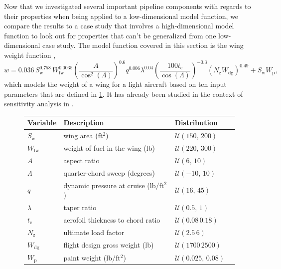 \documentclass[
  a4paper,  %
  twoside,  %
  bibliography=totoc,
  headsepline,
  cleardoublepage=empty,
  parskip=half,
  draft=false
]{scrbook}
\begin{document}
Now that we investigated several important pipeline components with regards to their properties when being applied to a low-dimensional model function, we compare the results to a case study that involves a high-dimensional model function to look out for properties that can't be generalized from one low-dimensional case study.
The model function covered in this section is the wing weight function \cite{Forrester2008},
\begin{equation}
w=0.036 \, S_\mathrm{w}^{0.758} \, W_\mathrm{fw}^{0.0035} \left(\frac{A}{\cos^2(\Lambda)}\right)^{0.6} q^{0.006} \lambda^{0.04} \left( \frac{100 t_\mathrm{c}}{\cos(\Lambda)} \right)^{-0.3} (N_\mathrm{z} W_\mathrm{dg})^{0.49} + S_\mathrm{w} W_\mathrm{p},
\end{equation}
which models the weight of a wing for a light aircraft based on ten input parameters that are defined in \cref{tab:ww_params}.
It has already been studied in the context of sensitivity analysis in \cite{Moon2012}.
\begin{mdframed}[style=style]
\begin{figure}[H]
\vspace{-2mm}
\centering
\bgroup
\def\arraystretch{1.2}%
  \begin{tabular}{ l l l l}
Variable & Description & Distribution\\
\hline
$S_{\mathrm{w}}$ & wing area (ft$^2$) & $\mathcal{U}(150,\, 200)$\\
$W_{\mathrm{fw}}$ & weight of fuel in the wing (lb) & $\mathcal{U}(220,\, 300)$\\
$A$ & aspect ratio & $\mathcal{U}(6,\, 10)$\\
$\Lambda$ & quarter-chord sweep (degrees) & $\mathcal{U}(-10 ,\,  10)$\\
$q$ & dynamic pressure at cruise (lb/ft$^2$) & $\mathcal{U}(16,\, 45)$\\
$\lambda$ & taper ratio & $\mathcal{U}(0.5, \, 1)$\\
$t_\mathrm{c}$ & aerofoil thickness to chord ratio & $\mathcal{U}(0.08\, 0.18)$\\
$N_\mathrm{z}$ & ultimate load factor & $\mathcal{U}(2.5\, 6)$\\
$W_\mathrm{dg}$ & flight design gross weight (lb)& $\mathcal{U}(1700\, 2500)$\\
$W_\mathrm{p}$ & paint weight (lb/ft$^2$) & $\mathcal{U}(0.025,\, 0.08)$\\
\end{tabular}
\egroup\\
\vspace{0.5em}
\delimit
{}
\label{tab:ww_params}
\end{figure}
\end{mdframed}
\end{document}
